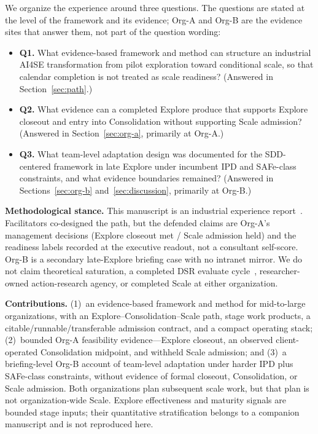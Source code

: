 \documentclass[10pt,conference]{IEEEtran}
\begin{document}
We organize the experience around three questions.
The questions are stated at the level of the framework and its evidence;
Org-A and Org-B are the evidence sites that answer them, not part of the
question wording:
\begin{itemize}
\item \textbf{Q1.}
What evidence-based framework and method can structure an industrial AI4SE
transformation from pilot exploration toward conditional scale, so that
calendar completion is not treated as scale readiness?
(Answered in Section~\ref{sec:path}.)
\item \textbf{Q2.}
What evidence can a completed Explore produce that supports Explore closeout
and entry into Consolidation without supporting Scale admission?
(Answered in Section~\ref{sec:org-a}, primarily at Org-A.)
\item \textbf{Q3.}
What team-level adaptation design was documented for the SDD-centered
framework in late Explore under incumbent IPD and SAFe-class constraints, and
what evidence boundaries remained?
(Answered in Sections~\ref{sec:org-b} and~\ref{sec:discussion}, primarily at Org-B.)
\end{itemize}

\textbf{Methodological stance.}
This manuscript is an industrial experience report~\cite{Runeson2009CaseStudy}.
Facilitators co-designed the path, but the defended claims are Org-A's
management decisions (Explore closeout met / Scale admission held) and the
readiness labels recorded at the executive readout, not a consultant self-score.
Org-B is a secondary late-Explore briefing case with no intranet mirror.
We do not claim theoretical saturation, a completed DSR evaluate
cycle~\cite{Hevner2004DSR}, researcher-owned action-research agency, or
completed Scale at either organization.

\textbf{Contributions.}
(1)~an evidence-based framework and method for mid-to-large organizations,
with an Explore--Consolidation--Scale path, stage work products, a
citable/runnable/transferable admission contract, and a compact operating
stack; (2)~bounded Org-A feasibility evidence---Explore closeout, an observed
client-operated Consolidation midpoint, and withheld Scale admission; and
(3)~a briefing-level Org-B account of team-level adaptation under harder IPD
plus SAFe-class constraints, without evidence of formal closeout,
Consolidation, or Scale admission. Both organizations plan subsequent scale
work, but that plan is not organization-wide Scale. Explore effectiveness and
maturity signals are bounded stage inputs; their quantitative stratification
belongs to a companion manuscript and is not reproduced here.
\end{document}
